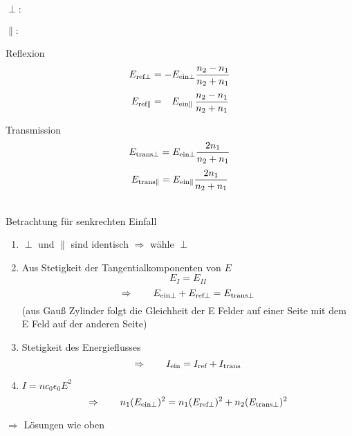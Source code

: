 \begin{minipage}{.05\linewidth}
	$ \perp : $ \\\\[5pt] $ \parallel : $
\end{minipage}%
\begin{minipage}{.45\linewidth}
	\centering
	Reflexion
	\begin{equation*}
	E_{\textrm{ref} \perp} = - E_{\textrm{ein} \perp} \frac{n_2 - n_1}{n_2 + n_1}
	\end{equation*}
	\begin{equation*}
	\phantom{-} \, E_{\tx{ref} \parallel} = \phantom{-} E_{\tx{ein} \parallel} \, \frac{n_2 - n_1}{n_2 + n_1} \ \ \,
	\end{equation*}
	\vspace{10pt}
\end{minipage}\nolinebreak%
\begin{minipage}{.45\linewidth}
	\centering
	Transmission
	\begin{equation*}
	E_{\textrm{trans} \perp} = E_{\textrm{ein} \perp} \frac{2 n_1}{n_2 + n_1}
	\end{equation*}
	\begin{equation*}
	E_{\textrm{trans} \parallel} = E_{\textrm{ein} \parallel} \frac{2 n_1}{n_2 + n_1}
	\end{equation*}
	\vspace{10pt}
\end{minipage}%
\\
Betrachtung für senkrechten Einfall\\
\begin{enumerate}[(1)]
	\item $ \perp $ und $ \parallel $ sind identisch $ \Rightarrow $ wähle $ \perp $
	\item Aus Stetigkeit der Tangentialkomponenten von $ E $
	\begin{equation*}
	E_{I} = E_{II}
	\end{equation*}
	\begin{equation*}
	\Rightarrow \qquad E_{\textrm{ein} \perp} + E_{\textrm{ref} \perp} = E_{\textrm{trans} \perp}
	\end{equation*}
	(aus Gauß Zylinder folgt die Gleichheit der E Felder auf einer Seite mit dem E Feld auf der anderen Seite)
	\item Stetigkeit des Energieflusses\\
	\begin{equation*}
	\Rightarrow \qquad I_{\textrm{ein}} = I_{\textrm{ref}} + I_{\textrm{trans}}
	\end{equation*}
	\item $ I = n c_0 \epsilon_0 E^2 $
	\begin{equation*}
	\Rightarrow \qquad n_1 (E_{\textrm{ein} \perp})^2 = n_1 (E_{\textrm{ref} \perp})^2 + n_2 (E_{\textrm{trans} \perp})^2
	\end{equation*}
\end{enumerate}
$ \Rightarrow $ Lösungen wie oben

